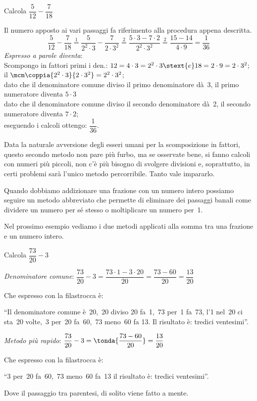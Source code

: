 \begin{esempio}{}{}
Calcola \(\dfrac{5}{12} - \dfrac{7}{18}\)

Il numero apposto ai vari passaggi fa riferimento alla procedura appena 
descritta.
\[\dfrac{5}{12} - \dfrac{7}{18} \stackrel{1}{=} 
  \dfrac{5}{2^2 \cdot 3} - \dfrac{7}{2 \cdot 3^2} \stackrel{2}{=} 
  \dfrac{5 \cdot 3 - 7 \cdot 2}{2^2 \cdot 3^2} \stackrel{2}{=} 
  \dfrac{15 - 14}{4 \cdot 9} = \dfrac{1}{36}\]
\emph{Espresso a parole diventa}:\\ 
Scompongo in fattori primi i den.:
\(12 = 4 \cdot 3 = 2^2 \cdot 3 \stext{ e } 18 = 2 \cdot 9 = 2 \cdot 3^2\);\\
il \(\mcm \coppia{2^2 \cdot 3}{2 \cdot 3^2} = 2^2 \cdot 3^2\);\\
dato che il denominatore comune diviso il primo denominatore dà~3, 
il primo numeratore diventa \(5 \cdot 3\)\\
dato che il denominatore comune diviso il secondo denominatore dà~2, 
il secondo numeratore diventa \(7 \cdot 2\);\\
eseguendo i calcoli ottengo: \(\dfrac{1}{36}\).
\end{esempio}

\begin{osservazione}{}{}
Data la naturale avversione degli esseri umani per la scomposizione in 
fattori, questo secondo metodo non pare più furbo, ma se osservate bene, si 
fanno calcoli con numeri più piccoli, non c'è più bisogno di svolgere 
divisioni e, soprattutto, in certi problemi sarà l'unico metodo 
percorribile. Tanto vale impararlo.
\end{osservazione}

Quando dobbiamo addizionare una frazione con un numero intero possiamo 
seguire un metodo abbreviato che permette di eliminare dei passaggi banali 
come dividere un numero per sé stesso o moltiplicare un numero per~1.

Nel prossimo esempio vediamo i due metodi applicati alla somma tra una 
frazione e un numero intero.

\begin{esempio}{}{} Calcola 
\(\dfrac{73}{20} - 3\)

\vspace{1em}
\emph{Denominatore comune}: \quad
\(\dfrac{73}{20} - 3 = \dfrac{73 \cdot 1 - 3 \cdot 20}{20} =
  \dfrac{73 - 60}{20} = \dfrac{13}{20}\)

Che espresso con la filastrocca è: 

``Il denominatore comune è~20,~20 diviso 20 fa~1,~73 per~1 fa~73, 
l'1 nel~20 ci sta~20 volte,~3 per~20 fa~60,~73 meno~60 fa 13.
Il risultato è: tredici ventesimi''.

\vspace{1em}
\emph{Metodo più rapido}: \quad
\(\dfrac{73}{20} - 3 = \tonda{\dfrac{73 - 60}{20}} = \dfrac{13}{20}\)

Che espresso con la filastrocca è: 

``3 per~20 fa~60,~73 meno~60 fa~13 il risultato è: tredici ventesimi''.

Dove il passaggio tra parentesi, di solito viene fatto a mente.
\end{esempio}

